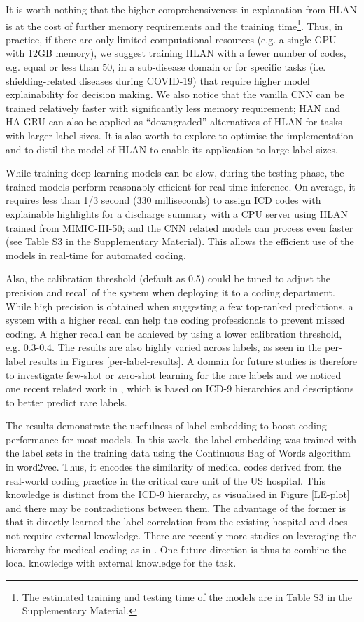 \documentclass[final,5p,times,twocolumn]{elsarticle}
\begin{document}
It is worth nothing that the higher comprehensiveness in explanation from HLAN is at the cost of further memory requirements and the training time\footnote{The estimated training and testing time of the models are in Table S3 in the Supplementary Material.}. Thus, in practice, if there are only limited computational resources (e.g. a single GPU with 12GB memory), we suggest training HLAN with a fewer number of codes, e.g. equal or less than 50, in a sub-disease domain or for specific tasks (i.e. shielding-related diseases during COVID-19) that require higher model explainability for decision making. We also notice that the vanilla CNN can be trained relatively faster with significantly less memory requirement; HAN and HA-GRU can also be applied as ``downgraded'' alternatives of HLAN for tasks with larger label sizes. It is also worth to explore to optimise the implementation and to distil the model of HLAN to enable its application to large label sizes.

While training deep learning models can be slow, during the testing phase, the trained models perform reasonably efficient for real-time inference. On average, it requires less than 1/3 second (330 milliseconds) to assign ICD codes with explainable highlights for a discharge summary with a CPU server using HLAN trained from MIMIC-III-50; and the CNN related models can process even faster (see Table S3 in the Supplementary Material). This allows the efficient use of the models in real-time for automated coding.

Also, the calibration threshold (default as 0.5) could be tuned to adjust the precision and recall of the system when deploying it to a coding department. While high precision is obtained when suggesting a few top-ranked predictions, a system with a higher recall can help the coding professionals to prevent missed coding. A higher recall can be achieved by using a lower calibration threshold, e.g. 0.3-0.4. The results are also highly varied across labels, as seen in the per-label results in Figures \ref{per-label-results}. A domain for future studies is therefore to investigate few-shot or zero-shot learning for the rare labels and we noticed one recent related work in \cite{rios-kavuluru-2018-shot}, which is based on ICD-9 hierarchies and descriptions to better predict rare labels.

The results demonstrate the usefulness of label embedding to boost coding performance for most models. In this work, the label embedding was trained with the label sets in the training data using the Continuous Bag of Words algorithm in word2vec. Thus, it encodes the similarity of medical codes derived from the real-world coding practice in the critical care unit of the US hospital. This knowledge is distinct from the ICD-9 hierarchy, as visualised in Figure \ref{LE-plot} and there may be contradictions between them. The advantage of the former is that it directly learned the label correlation from the existing hospital and does not require external knowledge. There are recently more studies on leveraging the hierarchy for medical coding as in \cite{falis-etal-2019-ontological,cao-etal-2020-hypercore}. One future direction is thus to combine the local knowledge with external knowledge for the task.
\end{document}
